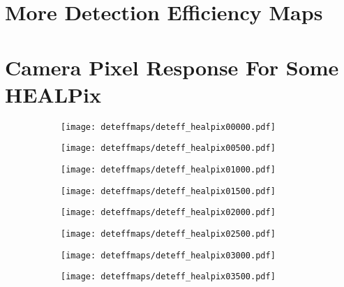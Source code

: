 \section{More Detection Efficiency Maps}

\section{Camera Pixel Response For Some HEALPix}

\begin{figure}[H]
	\centering
	\begin{subfigure}[t]{0.495\textwidth}
		\texttt{[image: deteffmaps/deteff\_healpix00000.pdf]}
		\subcaption{}
	\end{subfigure}
	\hfill
	\begin{subfigure}[t]{0.495\textwidth}
		\texttt{[image: deteffmaps/deteff\_healpix00500.pdf]}
		\subcaption{}
	\end{subfigure}
	\hfill
	\begin{subfigure}[t]{0.495\textwidth}
		\texttt{[image: deteffmaps/deteff\_healpix01000.pdf]}
		\subcaption{}
	\end{subfigure}
	\hfill
	\begin{subfigure}[t]{0.495\textwidth}
		\texttt{[image: deteffmaps/deteff\_healpix01500.pdf]}
		\subcaption{}
	\end{subfigure}
	\hfill
	\begin{subfigure}[t]{0.495\textwidth}
		\texttt{[image: deteffmaps/deteff\_healpix02000.pdf]}
		\subcaption{}
	\end{subfigure}
	\hfill
	\begin{subfigure}[t]{0.495\textwidth}
		\texttt{[image: deteffmaps/deteff\_healpix02500.pdf]}
		\subcaption{}
	\end{subfigure}
	\hfill
	\begin{subfigure}[t]{0.495\textwidth}
		\texttt{[image: deteffmaps/deteff\_healpix03000.pdf]}
		\subcaption{}
	\end{subfigure}
	\hfill
	\begin{subfigure}[t]{0.495\textwidth}
		\texttt{[image: deteffmaps/deteff\_healpix03500.pdf]}
		\subcaption{}
	\end{subfigure}
\end{figure}

